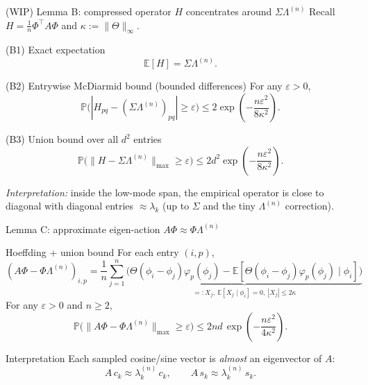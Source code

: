 \documentclass[10pt,aspectratio=169]{beamer}
\newcommand{\E}{\mathbb{E}}
\begin{document}
\begin{frame}{(WIP) Lemma B: compressed operator $H$ concentrates around $\Sigma\Lambda^{(n)}$}
	\small
	Recall $H=\frac1n\Phi^\top A\Phi$ and $\kappa:=\|\Theta\|_\infty$.

	\begin{block}{(B1) Exact expectation}
		\[
			\boxed{\E[H]=\Sigma\Lambda^{(n)}.}
		\]
	\end{block}

	\begin{block}{(B2) Entrywise McDiarmid bound (bounded differences)}
		For any $\varepsilon>0$,
		\[
			\boxed{
			\mathbb{P}\big(|H_{pq}-(\Sigma\Lambda^{(n)})_{pq}|\ge \varepsilon\big)
			\le 2\exp\!\left(-\frac{n\varepsilon^2}{8\kappa^2}\right).
			}
		\]
	\end{block}

	\begin{block}{(B3) Union bound over all $d^2$ entries}
		\[
			\boxed{
				\mathbb{P}\big(\|H-\Sigma\Lambda^{(n)}\|_{\max}\ge \varepsilon\big)
				\le 2d^2\exp\!\left(-\frac{n\varepsilon^2}{8\kappa^2}\right).
			}
		\]
	\end{block}

	\textit{Interpretation:} inside the low-mode span, the empirical operator is close to diagonal
	with diagonal entries $\approx \lambda_k$ (up to $\Sigma$ and the tiny $\Lambda^{(n)}$ correction).

\end{frame}

\begin{frame}{Lemma C: approximate eigen-action $A\Phi \approx \Phi\Lambda^{(n)}$}
	\begin{block}{Hoeffding + union bound}
		For each entry $(i,p)$,
		\[
			(A\Phi-\Phi\Lambda^{(n)})_{i,p}
			=\frac1n\sum_{j=1}^n\underbrace{\Big(\Theta(\phi_i-\phi_j)\varphi_p(\phi_j)-\E[\Theta(\phi_i-\phi_j)\varphi_p(\phi_j)\mid\phi_i]\Big)}_{=:X_j,\ \E[X_j\mid\phi_i]=0,\ |X_j|\le 2\kappa}
		\]
		For any $\varepsilon>0$ and $n\ge 2$,
		\[
			\boxed{
				\mathbb{P}\big(\|A\Phi-\Phi\Lambda^{(n)}\|_{\max}\ge \varepsilon\big)
				\le 2nd\,\exp\!\left(-\frac{n\varepsilon^2}{4\kappa^2}\right).
			}
		\]
	\end{block}
	\begin{block}{Interpretation}
		Each sampled cosine/sine vector is \emph{almost} an eigenvector of $A$:
		\[
			A\,c_k \approx \lambda_k^{(n)}\,c_k,\qquad
			A\,s_k \approx \lambda_k^{(n)}\,s_k.
		\]
	\end{block}

\end{frame}
\end{document}
